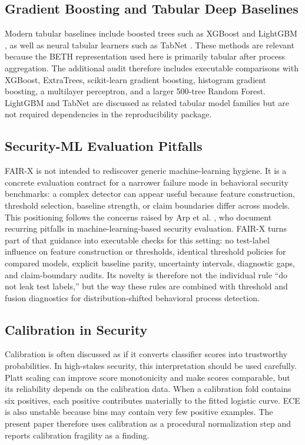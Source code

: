 \documentclass[10pt,journal,compsoc]{IEEEtran}
\begin{document}
\subsection{Gradient Boosting and Tabular Deep Baselines}

Modern tabular baselines include boosted trees such as XGBoost \cite{chen2016xgboost} and LightGBM \cite{ke2017lightgbm}, as well as neural tabular learners such as TabNet \cite{arik2021tabnet}. These methods are relevant because the BETH representation used here is primarily tabular after process aggregation. The additional audit therefore includes executable comparisons with XGBoost, ExtraTrees, scikit-learn gradient boosting, histogram gradient boosting, a multilayer perceptron, and a larger 500-tree Random Forest. LightGBM and TabNet are discussed as related tabular model families but are not required dependencies in the reproducibility package.

\subsection{Security-ML Evaluation Pitfalls}

FAIR-X is not intended to rediscover generic machine-learning hygiene. It is a concrete evaluation contract for a narrower failure mode in behavioral security benchmarks: a complex detector can appear useful because feature construction, threshold selection, baseline strength, or claim boundaries differ across models. This positioning follows the concerns raised by Arp et al. \cite{arp2022}, who document recurring pitfalls in machine-learning-based security evaluation. FAIR-X turns part of that guidance into executable checks for this setting: no test-label influence on feature construction or thresholds, identical threshold policies for compared models, explicit baseline parity, uncertainty intervals, diagnostic gaps, and claim-boundary audits. Its novelty is therefore not the individual rule ``do not leak test labels,'' but the way these rules are combined with threshold and fusion diagnostics for distribution-shifted behavioral process detection.

\subsection{Calibration in Security}

Calibration is often discussed as if it converts classifier scores into trustworthy probabilities. In high-stakes security, this interpretation should be used carefully. Platt scaling can improve score monotonicity and make scores comparable, but its reliability depends on the calibration data. When a calibration fold contains six positives, each positive contributes materially to the fitted logistic curve. ECE is also unstable because bins may contain very few positive examples. The present paper therefore uses calibration as a procedural normalization step and reports calibration fragility as a finding.
\end{document}
